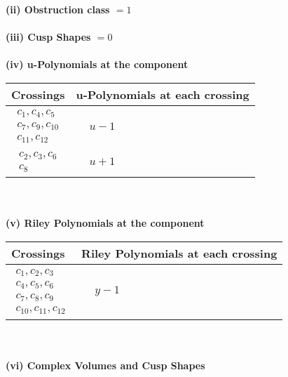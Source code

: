 \documentclass[1p]{elsarticle_modified}
\theoremstyle{definition}
\begin{document}
\flushleft \textbf{(ii) Obstruction class $= 1$}\\~\\
\flushleft \textbf{(iii) Cusp Shapes $= 0$}\\~\\
\newpage\renewcommand{\arraystretch}{1}
\flushleft \textbf{(iv) u-Polynomials at the component}\newline \\
\begin{tabular}{m{50pt}|m{274pt}}
Crossings & \hspace{64pt}u-Polynomials at each crossing \\
\hline $$\begin{aligned}c_{1},c_{4},c_{5}\\c_{7},c_{9},c_{10}\\c_{11},c_{12}\end{aligned}$$&$\begin{aligned}
&u-1
\end{aligned}$\\
\hline $$\begin{aligned}c_{2},c_{3},c_{6}\\c_{8}\end{aligned}$$&$\begin{aligned}
&u+1
\end{aligned}$\\
\hline
\end{tabular}\\~\\
\newpage\renewcommand{\arraystretch}{1}
\flushleft \textbf{(v) Riley Polynomials at the component}\newline \\
\begin{tabular}{m{50pt}|m{274pt}}
Crossings & \hspace{64pt}Riley Polynomials at each crossing \\
\hline $$\begin{aligned}c_{1},c_{2},c_{3}\\c_{4},c_{5},c_{6}\\c_{7},c_{8},c_{9}\\c_{10},c_{11},c_{12}\end{aligned}$$&$\begin{aligned}
&y-1
\end{aligned}$\\
\hline
\end{tabular}\\~\\
\newpage\flushleft \textbf{(vi) Complex Volumes and Cusp Shapes}
\end{document}
